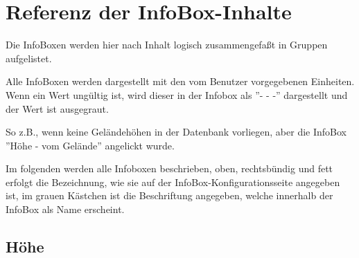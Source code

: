 \chapter{Referenz der InfoBox-Inhalte}\label{cha:infobox}
Die InfoBoxen werden hier nach Inhalt logisch zusammengefaßt  in Gruppen aufgelistet.

Alle InfoBoxen werden dargestellt mit den vom Benutzer vorgegebenen  Einheiten.
Wenn ein Wert ungültig ist, wird dieser in der Infobox als ''- - -'' dargestellt und der Wert ist ausgegraut.

So z.B., wenn keine Geländehöhen in der Datenbank vorliegen, aber die InfoBox  ''Höhe - vom Gelände'' angelickt wurde. 


Im folgenden werden alle Infoboxen beschrieben, oben, rechtsbündig und fett erfolgt die Bezeichnung, 
wie sie auf der InfoBox-Konfigurationsseite angegeben ist, im grauen Kästchen ist die Beschriftung angegeben,
welche innerhalb der InfoBox als Name erscheint.
%
\newcommand{\ibi}[3]{%
\jindent{%
\begin{tabular}{r}%
{\bf #1} \\%
\ibox{{#2}} \\%
\end{tabular}}{#3}%
}%
%
%
\section{Höhe}

